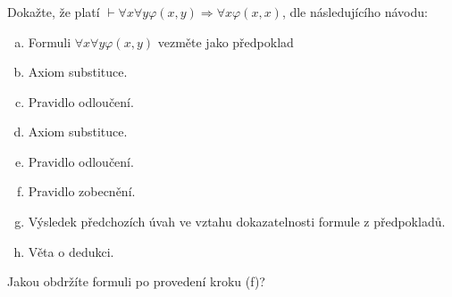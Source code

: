 \subsubsection{}
Dokažte, že platí $\vdash \forall x \forall y \varphi(x,y) \Rightarrow \forall x
\varphi (x,x)$, dle následujícího návodu:
\begin{enumerate}[(a)]
  \item Formuli $\forall x \forall y \varphi (x,y)$ vezměte jako předpoklad
  \item Axiom substituce.
  \item Pravidlo odloučení.
  \item Axiom substituce.
  \item Pravidlo odloučení.
  \item Pravidlo zobecnění.
  \item Výsledek předchozích úvah ve vztahu dokazatelnosti formule z
  předpokladů.
  \item Věta o dedukci.
\end{enumerate}
Jakou obdržíte formuli po provedení kroku (f)?
